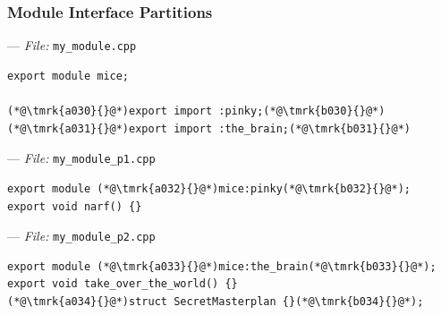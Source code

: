 \documentclass[aspectratio=169]{beamer}
\newif\iftransitions
\newcommand{\cpause}{\iftransitions \pause \fi}
\newcommand{\tmrk}[2]{\tikz[baseline,inner sep=0]\node[anchor=base](#1){#2};}
\begin{document}
\begin{frame}[fragile]
  \frametitle{Module Interface Partitions}

  --- \textit{File:} \texttt{my\_module.cpp}
  \begin{lstlisting}[style=cpp20]
export module mice;

(*@\tmrk{a030}{}@*)export import :pinky;(*@\tmrk{b030}{}@*)
(*@\tmrk{a031}{}@*)export import :the_brain;(*@\tmrk{b031}{}@*)
  \end{lstlisting}

  \cpause
  --- \textit{File:} \texttt{my\_module\_p1.cpp}
  \begin{lstlisting}[style=cpp20]
export module (*@\tmrk{a032}{}@*)mice:pinky(*@\tmrk{b032}{}@*);
export void narf() {}
  \end{lstlisting}

  --- \textit{File:} \texttt{my\_module\_p2.cpp}
  \begin{lstlisting}[style=cpp20]
export module (*@\tmrk{a033}{}@*)mice:the_brain(*@\tmrk{b033}{}@*);
export void take_over_the_world() {}
(*@\tmrk{a034}{}@*)struct SecretMasterplan {}(*@\tmrk{b034}{}@*);
  \end{lstlisting}

  \iftransitions
  \only<1-2>{\tikz[overlay]\filldraw[blue, opacity=0] ([shift={(0,-0.5ex)}]a030) rectangle ([shift={(0,2ex)}]b030);}
  \only<3>{\tikz[overlay]\filldraw[blue, opacity=0.3] ([shift={(0,-0.5ex)}]a030) rectangle ([shift={(0,2ex)}]b030);}
  \only<3>{\tikz[overlay]\filldraw[blue, opacity=0.3] ([shift={(0,-0.5ex)}]a031) rectangle ([shift={(0,2ex)}]b031);}
  \only<2>{\tikz[overlay]\filldraw[blue, opacity=0.3] ([shift={(0,-0.5ex)}]a032) rectangle ([shift={(0,2ex)}]b032);}
  \only<2>{\tikz[overlay]\filldraw[blue, opacity=0.3] ([shift={(0,-0.5ex)}]a033) rectangle ([shift={(0,2ex)}]b033);}
  \only<4>{\tikz[overlay]\filldraw[blue, opacity=0.3] ([shift={(0,-0.5ex)}]a034) rectangle ([shift={(0,2ex)}]b034);}
  \fi


\end{frame}
\end{document}
